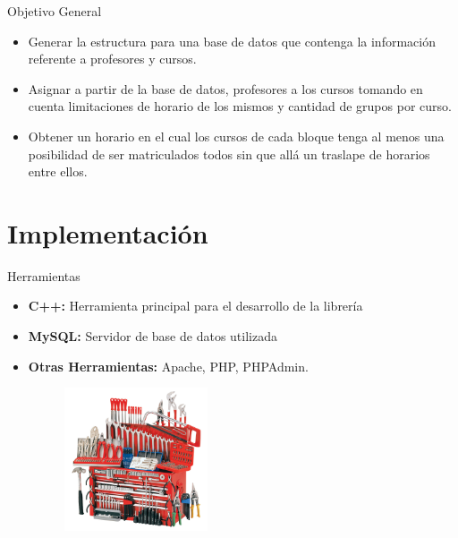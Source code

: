 \documentclass[10pt]{beamer}
\begin{document}
\begin{frame}{Objetivo General}
\begin{block}{}

\begin{itemize}
	\item Generar la estructura para una base de datos que contenga la información referente a profesores y cursos.
	\item Asignar a partir de la base de datos, profesores a los cursos tomando en cuenta limitaciones de horario de los mismos y cantidad de grupos por 	curso.
	\item Obtener un horario en el cual los cursos de cada bloque tenga al menos una posibilidad de ser matriculados todos sin que allá un traslape de 	horarios entre ellos.
\end{itemize}
  
\end{block}
\end{frame}



\section{Implementación}
\begin{frame}{Herramientas}
\begin{block}{}
\begin{itemize}
	\item \textbf{C++:} Herramienta principal para el desarrollo de la librería
	
	\item \textbf{MySQL:} Servidor de base de datos utilizada
	
	\item \textbf{Otras Herramientas:} Apache, PHP, PHPAdmin.

\begin{figure}[!h]
\centering
\includegraphics[width=0.40\textwidth]{./AAUgraphics/tools.jpg}
\end{figure}
	
 \end{itemize}
\end{block}
\end{frame}
\end{document}
